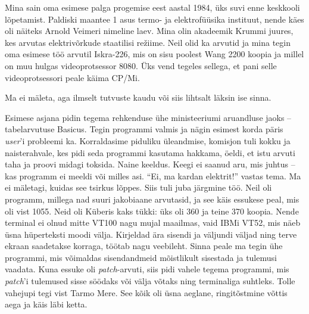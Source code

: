 Mina sain oma esimese palga progemise eest aastal 1984, 
üks suvi enne keskkooli lõpetamist. Paldiski maantee 1 asus termo- ja 
elektrofüüsika instituut, nende käes oli näiteks Arnold Veimeri nimeline laev.
Mina olin akadeemik Krummi juures, 
kes arvutas elektrivõrkude staatilisi režiime. Neil olid ka 
arvutid ja mina tegin oma esimese töö arvutil 
Iskra-226, mis on sisu poolest Wang 2200 koopia ja millel on muu hulgas videoprotsessor
8080. Üks vend tegeles sellega, et 
pani selle videoprotsessori peale käima CP/Mi. 


Ma ei mäleta, aga ilmselt tutvuste 
kaudu või siis lihtsalt läksin ise sinna.


Esimese asjana pidin tegema rehkenduse ühe
ministeeriumi aruandluse jaoks – tabelarvutuse Basicus. Tegin programmi valmis ja nägin esimest korda 
päris \emph{user}'i probleemi ka. Korraldasime piduliku üleandmise, 
komisjon tuli 
kokku ja naisterahvale, kes pidi seda 
programmi kasutama hakkama, öeldi, et istu arvuti taha ja proovi 
midagi toksida. Naine keeldus. Keegi ei saanud aru, 
mis juhtus – kas programm ei meeldi või milles asi. \enquote{Ei, ma kardan 
elektrit!} vastas tema. Ma ei mäletagi, kuidas see tsirkus lõppes. 
Siis tuli juba järgmine töö. Neil oli programm, millega nad suuri jakobiaane 
arvutasid, ja see käis essukese peal, mis oli vist 1055. Neid 
oli Küberis kaks tükki: üks oli 360 ja teine 370 koopia. Nende terminal ei olnud 
mitte VT100 nagu mujal maailmas, vaid IBMi VT52, mis näeb üsna 
hüperteksti moodi välja. Kirjeldad ära sisendi ja väljundi väljad ning terve 
ekraan saadetakse korraga, töötab nagu veebileht. Sinna peale 
ma tegin ühe programmi, mis võimaldas sisendandmeid mõistlikult sisestada ja tulemusi vaadata. Kuna essuke oli \emph{patch}-arvuti, siis pidi 
vahele tegema programmi, mis \emph{patch}'i tulemused 
sisse söödaks või välja võtaks ning 
terminaliga suhtleks. Tolle vahejupi tegi vist Tarmo Mere. See kõik oli üsna aeglane, ringitõstmine võttis
aega ja käis läbi ketta.

